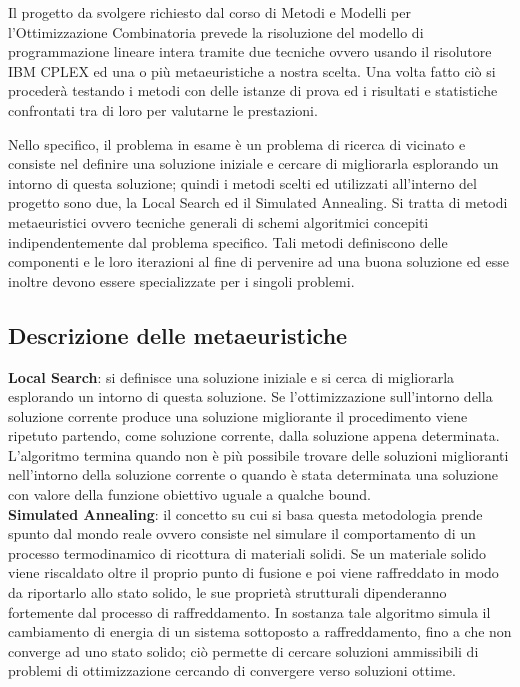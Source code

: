 \documentclass[preprint,12pt]{elsarticle}
\begin{document}
Il progetto da svolgere richiesto dal corso di Metodi e Modelli per l'Ottimizzazione Combinatoria prevede la risoluzione del modello di programmazione lineare intera tramite due tecniche ovvero usando il risolutore IBM CPLEX ed una o più metaeuristiche a nostra scelta. Una volta fatto ciò si procederà testando i metodi con delle istanze di prova ed i risultati e statistiche confrontati tra di loro per valutarne le prestazioni.

Nello specifico, il problema in esame è un problema di ricerca di vicinato e consiste nel definire una soluzione iniziale e cercare di migliorarla esplorando un intorno di questa soluzione; quindi i metodi scelti ed utilizzati all'interno del progetto sono due, la Local Search ed il Simulated Annealing. Si tratta di metodi metaeuristici ovvero tecniche generali di schemi algoritmici concepiti indipendentemente dal problema specifico. Tali metodi definiscono delle componenti e le loro iterazioni al fine di pervenire ad una buona soluzione ed esse inoltre devono essere specializzate per i singoli problemi. \\

\subsection{\textbf{Descrizione delle metaeuristiche}}


\textbf{Local Search}: si definisce una soluzione iniziale e si cerca di migliorarla esplorando un intorno di questa soluzione. Se l'ottimizzazione sull'intorno della soluzione corrente produce una soluzione migliorante il procedimento viene ripetuto partendo, come soluzione corrente, dalla soluzione appena determinata. L'algoritmo termina quando non è più possibile trovare delle soluzioni miglioranti nell'intorno della soluzione corrente o quando è stata determinata una soluzione con valore della funzione obiettivo uguale a qualche bound.\\

\textbf{Simulated Annealing}: il concetto su cui si basa questa metodologia prende spunto dal mondo reale ovvero consiste nel simulare il comportamento di un processo termodinamico di ricottura di materiali solidi. Se un materiale solido viene riscaldato oltre il proprio punto di fusione e poi viene raffreddato in modo da riportarlo allo stato solido, le sue proprietà strutturali dipenderanno fortemente dal processo di raffreddamento. In sostanza tale algoritmo simula il cambiamento di energia di un sistema sottoposto a raffreddamento, fino a che non converge ad uno stato solido; ciò permette di cercare soluzioni ammissibili di problemi di ottimizzazione cercando di convergere verso soluzioni ottime. \\
\end{document}

